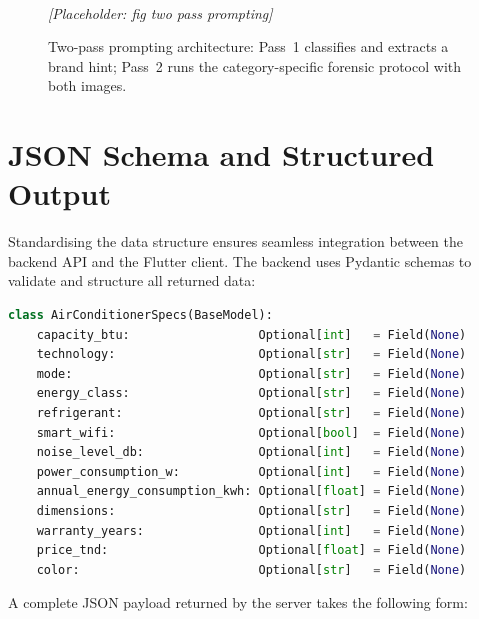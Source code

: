 \begin{figure}[htbp]
  \centering
  \framebox[\linewidth]{\rule{0pt}{4cm}}
  \\[4pt]
  {\small\textit{[Placeholder: fig two pass prompting]}}
  \caption{Two-pass prompting architecture: Pass~1 classifies and extracts a brand hint; Pass~2 runs the category-specific forensic protocol with both images.}
  \label{fig:ch4-prompting}
\end{figure}

\section{JSON Schema and Structured Output}
\label{sec:ch4-schema}

Standardising the data structure ensures seamless integration between the backend API and the Flutter client. The backend uses Pydantic schemas to validate and structure all returned data:

\begin{lstlisting}[language=Python, caption={Pydantic schema for air conditioner specifications}]
class AirConditionerSpecs(BaseModel):
    capacity_btu:                  Optional[int]   = Field(None)
    technology:                    Optional[str]   = Field(None)
    mode:                          Optional[str]   = Field(None)
    energy_class:                  Optional[str]   = Field(None)
    refrigerant:                   Optional[str]   = Field(None)
    smart_wifi:                    Optional[bool]  = Field(None)
    noise_level_db:                Optional[int]   = Field(None)
    power_consumption_w:           Optional[int]   = Field(None)
    annual_energy_consumption_kwh: Optional[float] = Field(None)
    dimensions:                    Optional[str]   = Field(None)
    warranty_years:                Optional[int]   = Field(None)
    price_tnd:                     Optional[float] = Field(None)
    color:                         Optional[str]   = Field(None)
\end{lstlisting}

A complete JSON payload returned by the server takes the following form:

